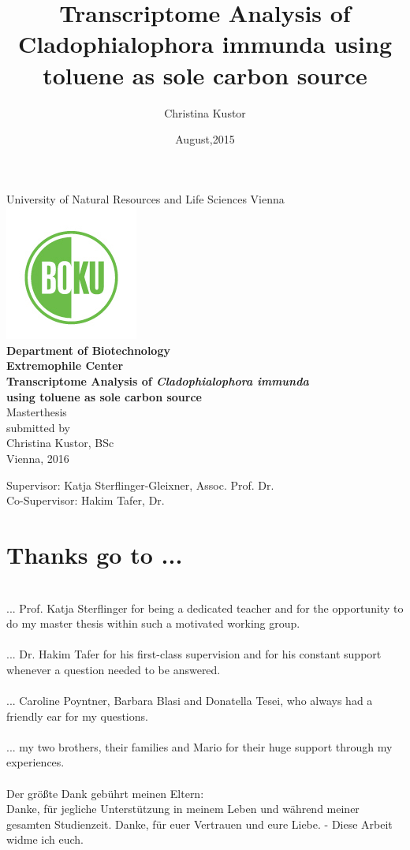 \documentclass[12pt, a4paper]{report}
\title{Transcriptome Analysis of Cladophialophora immunda using toluene as sole carbon source}
\author{Christina Kustor}
\date{August,2015}
\begin{document}
\newpage
\begin{center}
\large {University of Natural Resources and Life Sciences Vienna\\
\includegraphics{pics/boku_logo}\\
\bigskip
\textbf{Department of Biotechnology\\
Extremophile Center}}\\
\vspace*{1cm}
\LARGE\textbf{Transcriptome Analysis of 
\textit{Cladophialophora immunda} \\using toluene as sole carbon source}\\
\vspace*{0,5cm}
\large {Masterthesis\\
\vspace*{1,5cm}
submitted by \\
Christina Kustor, BSc\\
Vienna, 2016\\
\vspace*{1cm}}
\end{center}
Supervisor: Katja Sterflinger-Gleixner, Assoc. Prof. Dr.\\
Co-Supervisor: Hakim Tafer, Dr.\\
\newpage
\section*{Thanks go to ...}
\ \\
... Prof. Katja Sterflinger for being a dedicated teacher and for the opportunity to do my master thesis within such a motivated working group. \\
\ \\
... Dr. Hakim Tafer for his first-class supervision and for his constant support whenever a question needed to be answered. \\
\ \\
... Caroline Poyntner, Barbara Blasi and Donatella Tesei, who always had a friendly ear for my questions. \\
\ \\
... my two brothers, their families and Mario for their huge support through my experiences. \\ 
\ \\
Der größte Dank gebührt meinen Eltern: \\
Danke, für jegliche Unterstützung in meinem Leben und während meiner gesamten Studienzeit. Danke, für euer Vertrauen und eure Liebe. - Diese Arbeit widme ich euch. 
\end{document}

